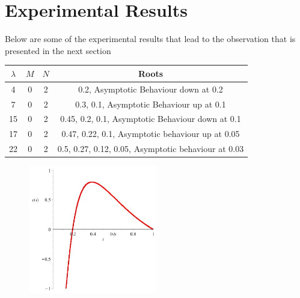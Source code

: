\documentclass[executivepaper]{article}
\begin{document}
\vspace*{-40mm}

\section*{Experimental Results}

Below are some of the experimental results that lead to the observation that is presented in the next section

\begin{center}

\begin{tabular}{||c c c c||}

\hline

$\lambda$ & $M$ & $N$ & Roots \\ [0.5ex]

\hline\hline

4 & 0 & 2 & 0.2, Asymptotic Behaviour down at 0.2 \\ 

\hline

7 & 0 & 2 & 0.3, 0.1, Asymptotic Behaviour up at 0.1 \\

\hline

15 & 0 & 2 & 0.45, 0.2, 0.1, Asymptotic Behaviour down at 0.1 \\

\hline

17 & 0 & 2 & 0.47, 0.22, 0.1, Asymptotic behaviour up at 0.05 \\
\hline

22 & 0 & 2 & 0.5, 0.27, 0.12, 0.05, Asymptotic behaviour at 0.03 \\ [1ex]

\hline

\end{tabular}

\begin{figure}[!ht]

\centering

\includegraphics[width=0.5\textwidth]{NEquals2MEquals0LambdaEquals4}


\end{figure}
\end{center}
\end{document}
